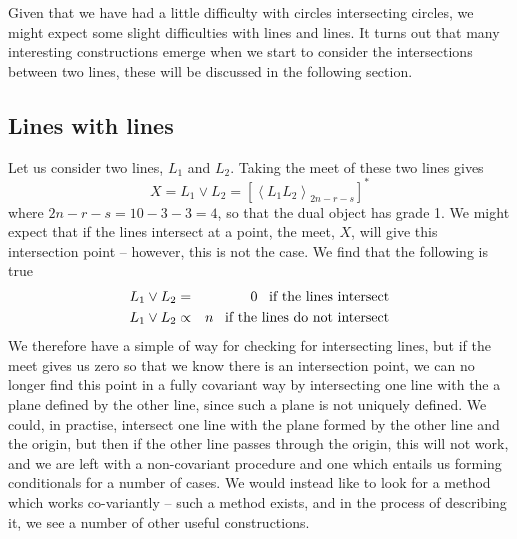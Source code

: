 Given that we have had a little difficulty with circles
intersecting circles, we might expect some slight
difficulties with lines and lines. It turns out that many
interesting constructions emerge when we start to
consider the intersections between two lines, these will
be discussed in the following section.


\subsection{Lines with lines }

Let us consider two lines, $L_1$ and $L_2$. Taking the
meet of these two lines gives
%
\begin{equation}
X = L_1 \vee L_2 = \left[\left< L_1 L_2
\right>_{2n-r-s}\right]^*
\end{equation}
%
where $2n-r-s=10-3-3=4$, so that the dual object has
grade 1. We might expect that if the lines intersect at a
point, the meet, $X$, will give this intersection point
-- however, this is not the case. We find that the
following is true
%
\begin{eqnarray}
L_1 \vee L_2 & = & 0 \;\;\; \mbox{if the lines intersect}
\nonumber \\
L_1 \vee L_2 & \propto & n \;\;\; \mbox{if the lines do
not intersect}
\end{eqnarray}
%
We therefore have a simple of way for checking for
intersecting lines, but if the meet gives us zero so that
we know there is an intersection point, we can no longer
find this point in a fully covariant way by intersecting
one line with the a plane defined by the other line,
since such a plane is not uniquely defined. We could, in
practise, intersect one line with the plane formed by the
other line and the origin, but then if the other line
passes through the origin, this will not work, and we are
left with a non-covariant procedure and one which entails
us forming conditionals for a number of cases. We would
instead like to look for a method which works co-variantly
-- such a method exists, and in the process of describing
it, we see a number of other useful constructions.

